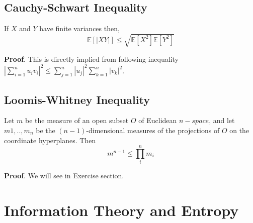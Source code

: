\documentclass[10pt]{article}
\begin{document}
\subsection*{Cauchy-Schwart Inequality}
If $X$ and $Y$ have finite variances then,
\[\mathbb{E}[|XY|]  \leqslant \sqrt{\mathbb{E}[X^2] \mathbb{E}[Y^2]}\]

\textbf{Proof}. This is directly implied from following inequality $|\sum_{i=1}^{n}u_{i}v_{i}|^2 \leqslant \sum_{j=1}^{n}|u_{j}|^2 \sum_{k=1}^{n}|v_{k}|^2$.

\subsection*{Loomis-Whitney Inequality}
Let $m$ be the measure of an open subset $O$ of Euclidean $n-space$, and let $m1,..,m_n$ be the $(n-1)$-dimensional measures of the projections of $O$ on the coordinate hyperplanes. Then
\[ m^{n-1} \leqslant \prod_{i}^{n}m_i \]

\textbf{Proof}. We will see in Exercise section.

\section{Information Theory and Entropy}
\end{document}
